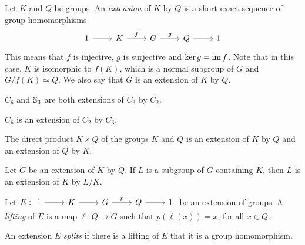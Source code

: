 \chapter{}


Let $K$ and $Q$ be groups.
An {\em extension} of $K$ by $Q$ is a
short exact sequence of group homomorphisms 
\[
\begin{tikzcd}
	1 & K & G & Q & 1
	\arrow[from=1-1, to=1-2]
	\arrow["f", from=1-2, to=1-3]
	\arrow["g", from=1-3, to=1-4]
	\arrow[from=1-4, to=1-5]
\end{tikzcd}
\]
This means that $f$ is injective, $g$ is surjective and $\ker g=\operatorname{im} f$. Note that in this case, $K$ is isomorphic to $f(K)$, which is a normal subgroup of $G$ and $G/f(K)\simeq Q$. We also say that $G$ is an extension of $K$ by $Q$.

\begin{example}
	$C_6$ and $\mathbb{S}_3$ are both extensions of $C_3$ by $C_2$.
\end{example}

\begin{example}
	$C_6$ is an extension of $C_2$ by $C_3$.
\end{example}

\begin{example}
    The direct product $K\times Q$ of the groups $K$ and $Q$ 
    is an extension of $K$ by $Q$ and an extension of $Q$ by $K$. 
\end{example}

\begin{example}
Let $G$ be an extension of $K$ by $Q$. If $L$ is a subgroup of $G$ containing $K$, 
then $L$ is an extension
of $K$ by $L/K$.
\end{example}

Let $E:
\begin{tikzcd}
	1 & K & G & Q & 1
	\arrow[from=1-1, to=1-2]
	\arrow[from=1-2, to=1-3]
	\arrow["p", from=1-3, to=1-4]
	\arrow[from=1-4, to=1-5]
\end{tikzcd}$
be an extension of groups. A {\em lifting} of $E$ is a map $\ell\colon
Q\to G$ such that $p(\ell(x))=x$, for all $x\in Q$. 

An extension $E$ {\em splits} if there is a lifting of $E$ that it is a group
homomorphism. 

